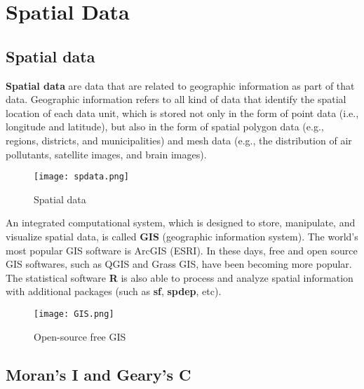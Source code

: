 \documentclass[11pt, A4paper, openany, uplatex]{book}
\begin{document}

\chapter{Spatial Data}\label{chap:spatial_correlation}

\section{Spatial data}

\textbf{Spatial data} are data that are related to geographic information as part of that data. 
Geographic information refers to all kind of data that identify the spatial location of each data unit, which is stored not only in the form of point data (i.e., longitude and latitude), but also in the form of spatial polygon data (e.g., regions, districts, and municipalities) and mesh data (e.g., the distribution of air pollutants, satellite images, and brain images).
\begin{figure}[h!]
	\begin{center}
		\texttt{[image: spdata.png]}
		\caption{Spatial data\label{fig:spdata}}
	\end{center}
\end{figure}

An integrated computational system, which is designed to store, manipulate, and visualize spatial data, is called \textbf{GIS} (geographic information system). 
 The world's most popular GIS software is ArcGIS (ESRI).
 In these days, free and open source GIS softwares, such as QGIS and Grass GIS, have been becoming more popular.  
The statistical software \textbf{R} is also able to process and analyze spatial information with additional packages (such as \textbf{sf}, \textbf{spdep}, etc).

\begin{figure}[h!]
	\begin{center}
		\texttt{[image: GIS.png]}
		\caption{Open-source free GIS\label{fig:GIS}}
	\end{center}
\end{figure}

\section{Moran's I and Geary's C}
\end{document}
